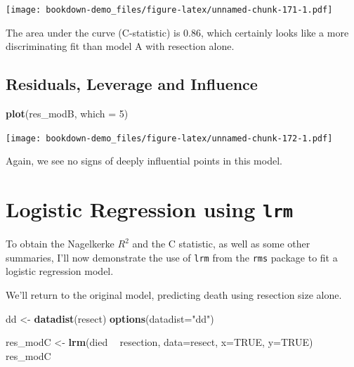 \documentclass[]{book}
\newenvironment{Shaded}{\begin{snugshade}}{\end{snugshade}}
\newcommand{\KeywordTok}[1]{\textcolor[rgb]{0.13,0.29,0.53}{\textbf{#1}}}
\newcommand{\DataTypeTok}[1]{\textcolor[rgb]{0.13,0.29,0.53}{#1}}
\newcommand{\DecValTok}[1]{\textcolor[rgb]{0.00,0.00,0.81}{#1}}
\newcommand{\StringTok}[1]{\textcolor[rgb]{0.31,0.60,0.02}{#1}}
\newcommand{\OtherTok}[1]{\textcolor[rgb]{0.56,0.35,0.01}{#1}}
\newcommand{\OperatorTok}[1]{\textcolor[rgb]{0.81,0.36,0.00}{\textbf{#1}}}
\newcommand{\NormalTok}[1]{#1}
\theoremstyle{definition}
\theoremstyle{definition}
\theoremstyle{definition}
\theoremstyle{remark}
\begin{document}
\texttt{[image: bookdown-demo\_files/figure-latex/unnamed-chunk-171-1.pdf]}

The area under the curve (C-statistic) is 0.86, which certainly looks
like a more discriminating fit than model A with resection alone.

\subsection{Residuals, Leverage and
Influence}\label{residuals-leverage-and-influence}

\begin{Shaded}
\begin{Highlighting}[]
\KeywordTok{plot}\NormalTok{(res_modB, }\DataTypeTok{which =} \DecValTok{5}\NormalTok{)}
\end{Highlighting}
\end{Shaded}

\texttt{[image: bookdown-demo\_files/figure-latex/unnamed-chunk-172-1.pdf]}

Again, we see no signs of deeply influential points in this model.

\section{\texorpdfstring{Logistic Regression using
\texttt{lrm}}{Logistic Regression using lrm}}\label{logistic-regression-using-lrm}

To obtain the Nagelkerke \(R^2\) and the C statistic, as well as some
other summaries, I'll now demonstrate the use of \texttt{lrm} from the
\texttt{rms} package to fit a logistic regression model.

We'll return to the original model, predicting death using resection
size alone.

\begin{Shaded}
\begin{Highlighting}[]
\NormalTok{dd <-}\StringTok{ }\KeywordTok{datadist}\NormalTok{(resect)}
\KeywordTok{options}\NormalTok{(}\DataTypeTok{datadist=}\StringTok{"dd"}\NormalTok{)}

\NormalTok{res_modC <-}\StringTok{ }\KeywordTok{lrm}\NormalTok{(died }\OperatorTok{~}\StringTok{ }\NormalTok{resection, }\DataTypeTok{data=}\NormalTok{resect, }\DataTypeTok{x=}\OtherTok{TRUE}\NormalTok{, }\DataTypeTok{y=}\OtherTok{TRUE}\NormalTok{)}
\NormalTok{res_modC}
\end{Highlighting}
\end{Shaded}
\end{document}
